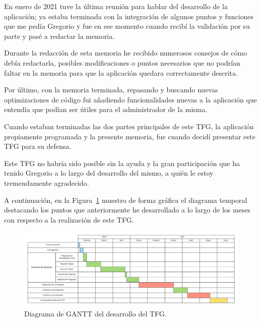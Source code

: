 \documentclass[a4paper, 12pt]{book}
\begin{document}
En enero de 2021 tuve la última reunión para hablar del desarrollo de la aplicación; ya estaba terminada con la integración de algunos puntos y funciones que me pedía Gregorio y fue en ese momento cuando recibí la validación por su parte y pasé a redactar la memoria.

Durante la redacción de esta memoria he recibido numerosos consejos de cómo debía redactarla, posibles modificaciones o puntos necesarios que no podrían faltar en la memoria para que la aplicación quedara correctamente descrita.

Por último, con la memoria terminada, repasando y buscando nuevas optimizaciones de código fui añadiendo funcionalidades nuevas a la aplicación que entendía que podían ser útiles para el administrador de la misma.

Cuando estaban terminadas las dos partes principales de este TFG, la aplicación propiamente programada y la presente memoria, fue cuando decidí presentar este TFG para su defensa.

Este TFG no habría sido posible sin la ayuda y la gran participación que ha tenido Gregorio a lo largo del desarrollo del mismo, a quién le estoy tremendamente agradecido.

\vspace{5mm}

A continuación, en la Figura~\ref{fig:diagrama} muestro de forma gráfica el diagrama temporal destacando los puntos que anteriormente he desarrollado a lo largo de los meses con respecto a la realización de este TFG.

\begin{figure}[h!]
  \centering
  \includegraphics[width=16cm, keepaspectratio]{img/diagrama.png}
  \caption{Diagrama de GANTT del desarrollo del TFG.}\label{fig:diagrama}
\end{figure}



\end{document}
